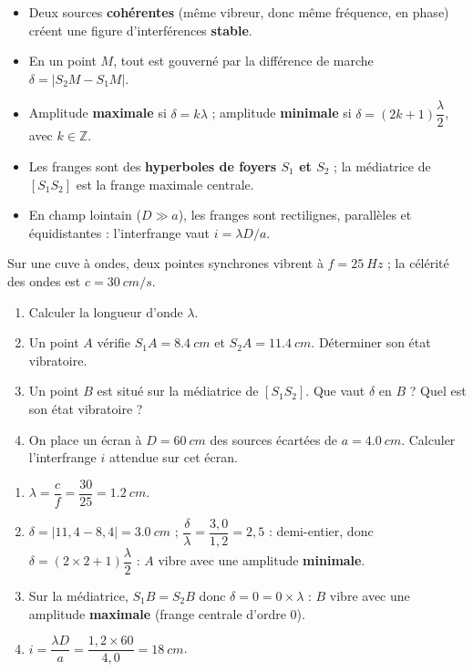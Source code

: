 \documentclass[11pt]{article}
\begin{document}
\begin{aretenir}
\begin{itemize}
\item Deux sources \textbf{cohérentes} (même vibreur, donc même fréquence, en phase) créent une figure d'interférences \textbf{stable}.
\item En un point $M$, tout est gouverné par la différence de marche $\delta = |S_2M - S_1M|$.
\item Amplitude \textbf{maximale} si $\delta = k\lambda$ ; amplitude \textbf{minimale} si $\delta = (2k+1)\dfrac{\lambda}{2}$, avec $k \in \mathbb{Z}$.
\item Les franges sont des \textbf{hyperboles de foyers $S_1$ et $S_2$} ; la médiatrice de $[S_1S_2]$ est la frange maximale centrale.
\item En champ lointain ($D \gg a$), les franges sont rectilignes, parallèles et équidistantes : l'interfrange vaut $i = \lambda D / a$.
\end{itemize}
\end{aretenir}

\begin{exercice}
Sur une cuve à ondes, deux pointes synchrones vibrent à $f = \SI{25}{Hz}$ ; la célérité des ondes est $c = \SI{30}{cm/s}$.
\begin{enumerate}
\item Calculer la longueur d'onde $\lambda$.
\item Un point $A$ vérifie $S_1A = \SI{8,4}{cm}$ et $S_2A = \SI{11,4}{cm}$. Déterminer son état vibratoire.
\item Un point $B$ est situé sur la médiatrice de $[S_1S_2]$. Que vaut $\delta$ en $B$ ? Quel est son état vibratoire ?
\item On place un écran à $D = \SI{60}{cm}$ des sources écartées de $a = \SI{4,0}{cm}$. Calculer l'interfrange $i$ attendue sur cet écran.
\end{enumerate}
\end{exercice}

\begin{corrige}
\begin{enumerate}
\item $\lambda = \dfrac{c}{f} = \dfrac{30}{25} = \SI{1,2}{cm}$.
\item $\delta = |11{,}4 - 8{,}4| = \SI{3,0}{cm}$ ; $\dfrac{\delta}{\lambda} = \dfrac{3{,}0}{1{,}2} = 2{,}5$ : demi-entier, donc $\delta = (2\times 2 + 1)\dfrac{\lambda}{2}$ : $A$ vibre avec une amplitude \textbf{minimale}.
\item Sur la médiatrice, $S_1B = S_2B$ donc $\delta = 0 = 0\times\lambda$ : $B$ vibre avec une amplitude \textbf{maximale} (frange centrale d'ordre 0).
\item $i = \dfrac{\lambda D}{a} = \dfrac{1,2 \times 60}{4,0} = \SI{18}{cm}$.
\end{enumerate}
\end{corrige}
\end{document}
